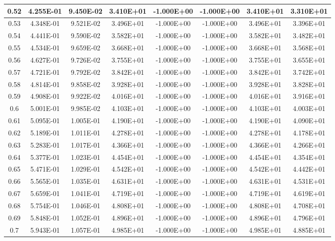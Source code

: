 \documentclass{article}
\begin{document}
\begin{center}
\begin{longtable}{|c|c|c|c|c|c|c|c|}
    0.52 & 4.255E-01 & 9.450E-02 & 3.410E+01 & -1.000E+00 & -1.000E+00 & 3.410E+01 & 3.310E+01 \\ \hline
    0.53 & 4.348E-01 & 9.521E-02 & 3.496E+01 & -1.000E+00 & -1.000E+00 & 3.496E+01 & 3.396E+01 \\ \hline
    0.54 & 4.441E-01 & 9.590E-02 & 3.582E+01 & -1.000E+00 & -1.000E+00 & 3.582E+01 & 3.482E+01 \\ \hline
    0.55 & 4.534E-01 & 9.659E-02 & 3.668E+01 & -1.000E+00 & -1.000E+00 & 3.668E+01 & 3.568E+01 \\ \hline
    0.56 & 4.627E-01 & 9.726E-02 & 3.755E+01 & -1.000E+00 & -1.000E+00 & 3.755E+01 & 3.655E+01 \\ \hline
    0.57 & 4.721E-01 & 9.792E-02 & 3.842E+01 & -1.000E+00 & -1.000E+00 & 3.842E+01 & 3.742E+01 \\ \hline
0.58 & 4.814E-01 & 9.858E-02 & 3.928E+01 & -1.000E+00 & -1.000E+00 & 3.928E+01 & 3.828E+01 \\ \hline
0.59 & 4.908E-01 & 9.922E-02 & 4.016E+01 & -1.000E+00 & -1.000E+00 & 4.016E+01 & 3.916E+01 \\ \hline
0.6 & 5.001E-01 & 9.985E-02 & 4.103E+01 & -1.000E+00 & -1.000E+00 & 4.103E+01 & 4.003E+01 \\ \hline
0.61 & 5.095E-01 & 1.005E-01 & 4.190E+01 & -1.000E+00 & -1.000E+00 & 4.190E+01 & 4.090E+01 \\ \hline
0.62 & 5.189E-01 & 1.011E-01 & 4.278E+01 & -1.000E+00 & -1.000E+00 & 4.278E+01 & 4.178E+01 \\ \hline
0.63 & 5.283E-01 & 1.017E-01 & 4.366E+01 & -1.000E+00 & -1.000E+00 & 4.366E+01 & 4.266E+01 \\ \hline
0.64 & 5.377E-01 & 1.023E-01 & 4.454E+01 & -1.000E+00 & -1.000E+00 & 4.454E+01 & 4.354E+01 \\ \hline
0.65 & 5.471E-01 & 1.029E-01 & 4.542E+01 & -1.000E+00 & -1.000E+00 & 4.542E+01 & 4.442E+01 \\ \hline
0.66 & 5.565E-01 & 1.035E-01 & 4.631E+01 & -1.000E+00 & -1.000E+00 & 4.631E+01 & 4.531E+01 \\ \hline
0.67 & 5.659E-01 & 1.041E-01 & 4.719E+01 & -1.000E+00 & -1.000E+00 & 4.719E+01 & 4.619E+01 \\ \hline
0.68 & 5.754E-01 & 1.046E-01 & 4.808E+01 & -1.000E+00 & -1.000E+00 & 4.808E+01 & 4.708E+01 \\ \hline
0.69 & 5.848E-01 & 1.052E-01 & 4.896E+01 & -1.000E+00 & -1.000E+00 & 4.896E+01 & 4.796E+01 \\ \hline
0.7 & 5.943E-01 & 1.057E-01 & 4.985E+01 & -1.000E+00 & -1.000E+00 & 4.985E+01 & 4.885E+01 \\ \hline

\end{longtable}
\end{center}
\end{document}
